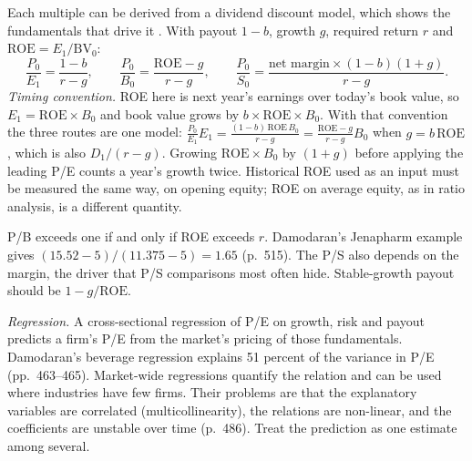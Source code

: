 \begin{qfmethod}\label{meth:justified-multiples}
 Each multiple can be derived from a dividend discount model, which shows the fundamentals that drive it \citep[pp.~460--461, 515, 545]{investment-valuation-2012}. With payout $1-b$, growth $g$, required return $r$ and $\mathrm{ROE}=E_1/\mathrm{BV}_0$:
\[ \frac{P_0}{E_1}=\frac{1-b}{r-g},\qquad\frac{P_0}{B_0}=\frac{\mathrm{ROE}-g}{r-g},\qquad\frac{P_0}{S_0}=\frac{\text{net margin}\times(1-b)(1+g)}{r-g}. \]
\emph{Timing convention.} ROE here is next year's earnings over today's book value, so $E_1=\mathrm{ROE}\times B_0$ and book value grows by $b\times\mathrm{ROE}\times B_0$. With that convention the three routes are one model: $\frac{P_0}{E_1}E_1=\frac{(1-b)\,\mathrm{ROE}\,B_0}{r-g}=\frac{\mathrm{ROE}-g}{r-g}B_0$ when $g=b\,\mathrm{ROE}$, which is also $D_1/(r-g)$. Growing $\mathrm{ROE}\times B_0$ by $(1+g)$ before applying the leading P/E counts a year's growth twice. Historical ROE used as an input must be measured the same way, on opening equity; ROE on average equity, as in ratio analysis, is a different quantity.

P/B exceeds one if and only if ROE exceeds $r$. Damodaran's Jenapharm example gives $(15.52-5)/(11.375-5)=1.65$ (p.~515). The P/S also depends on the margin, the driver that P/S comparisons most often hide. Stable-growth payout should be $1-g/\mathrm{ROE}$.

\emph{Regression.} A cross-sectional regression of P/E on growth, risk and payout predicts a firm's P/E from the market's pricing of those fundamentals. Damodaran's beverage regression explains 51 percent of the variance in P/E (pp.~463--465). Market-wide regressions quantify the relation and can be used where industries have few firms. Their problems are that the explanatory variables are correlated (multicollinearity), the relations are non-linear, and the coefficients are unstable over time (p.~486). Treat the prediction as one estimate among several.


\end{qfmethod}

